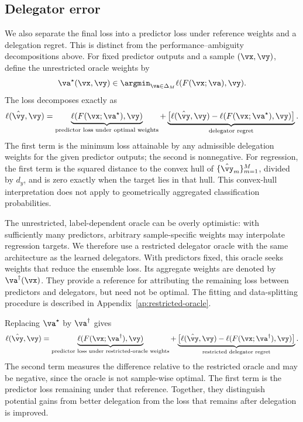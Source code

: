 \documentclass[10pt]{article} %
\begin{document}
\subsection{Delegator error}

We also separate the final loss into a predictor loss under reference weights and a delegation regret. This is distinct from the performance--ambiguity decompositions above. For fixed predictor outputs and a sample $(\vx,\vy)$, define the unrestricted oracle weights by
\begin{equation}
    \va^\star(\vx,\vy) \in \argmin_{\va\in\Delta_M}
        \ell(F(\vx;\va),\vy).
\end{equation}
The loss decomposes exactly as
\begin{equation}\label{eq:delegator-decomposition}
    \ell(\hat{\vy},\vy)
    = \underbrace{\ell(F(\vx;\va^\star),\vy)}_{\text{predictor loss under optimal weights}}
    + \underbrace{\big[\ell(\hat{\vy},\vy)-\ell(F(\vx;\va^\star),\vy)\big]}_{\text{delegator regret}}.
\end{equation}
The first term is the minimum loss attainable by any admissible delegation weights for the given predictor outputs; the second is nonnegative. For regression, the first term is the squared distance to the convex hull of $\{\hat{\vy}_m\}_{m=1}^M$, divided by $d_y$, and is zero exactly when the target lies in that hull. This convex-hull interpretation does not apply to geometrically aggregated classification probabilities.

The unrestricted, label-dependent oracle can be overly optimistic: with sufficiently many predictors, arbitrary sample-specific weights may interpolate regression targets. We therefore use a restricted delegator oracle with the same architecture as the learned delegators. With predictors fixed, this oracle seeks weights that reduce the ensemble loss. Its aggregate weights are denoted by $\va^\dagger(\vx)$. They provide a reference for attributing the remaining loss between predictors and delegators, but need not be optimal. The fitting and data-splitting procedure is described in Appendix~\ref{ap:restricted-oracle}.  

Replacing $\va^\star$ by $\va^\dagger$ gives
\begin{equation}\label{eq:restricted-delegator-decomposition}
    \ell(\hat{\vy},\vy)
    = \underbrace{\ell(F(\vx;\va^\dagger),\vy)}_{\text{predictor loss under restricted-oracle weights}}
    + \underbrace{\big[\ell(\hat{\vy},\vy)-\ell(F(\vx;\va^\dagger),\vy)\big]}_{\text{restricted delegator regret}}.
\end{equation}
The second term measures the difference relative to the restricted oracle and may be negative, since the oracle is not sample-wise optimal. The first term is the predictor loss remaining under that reference. Together, they distinguish potential gains from better delegation from the loss that remains after delegation is improved.
\end{document}
